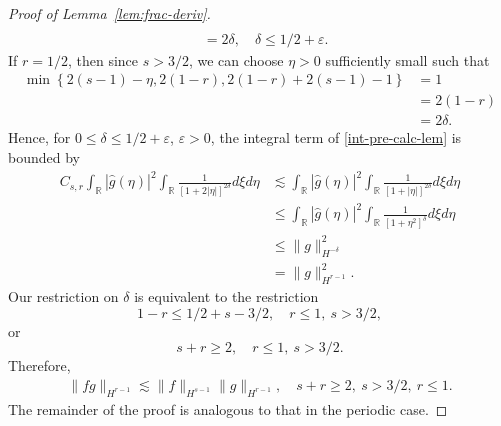 \documentclass[12pt,reqno]{amsart}
\numberwithin{equation}{section}  %
\numberwithin{figure}{section}
\newcommand{\rr}{\mathbb{R}}
\newcommand{\wh}{\widehat}
\newcommand{\ee}{\varepsilon}
\begin{document}
\begin{proof}[Proof of Lemma~\ref{lem:frac-deriv}]
\begin{equation*}
\begin{split}
  \\
  & = 2 \delta, \quad \delta \le 1/2 + \ee.
\end{split}
\end{equation*}
%
If $r = 1/2$, then since $s > 3/2$, we can choose $\eta > 0$ sufficiently small
such that
%
%
\begin{equation*}
\begin{split}
  \min\left\{ 2(s-1) -\eta , 2(1-r), 2(1-r) + 2(s-1) - 1  \right\}
  & = 1 
  \\
  & = 2(1 -r)
  \\
  & = 2\delta.
\end{split}
\end{equation*}
%
Hence, for $0 \le \delta \le 1/2 + \ee$, $\ee >
0$, the integral term of \eqref{int-pre-calc-lem} is bounded by
\begin{equation*}
\begin{split}
  C_{s,r} \int_{\rr}  | \wh{g}(\eta) |^{2} \int_{\rr} \frac{1}{\left[ 1
  + 2 |\eta| \right]^{2 \delta}} d \xi d \eta 
  & \lesssim
  \int_{\rr}  | \wh{g}(\eta) |^{2} \int_{\rr} \frac{1}{\left[ 1
  + |\eta| \right]^{2 \delta}} d \xi d \eta  
  \\
  & \le \int_{\rr}  | \wh{g}(\eta) |^{2} \int_{\rr} \frac{1}{\left[ 1
  + \eta^{2} \right]^{\delta}} d \xi d \eta  
  \\
  & \le \| g \|_{H^{-\delta}}^{2}
  \\
  & = \| g \|_{H^{r-1}}^{2}.
\end{split}
\end{equation*}
%
Our restriction on $\delta$ is equivalent to the restriction 
$$1-r \le 1/2 + s - 3/2, \quad r \le 1, \ s > 3/2,$$ or
$$s + r \ge 2,  \quad  r \le 1, \ s > 3/2.$$ Therefore, 
%
%
%
%
\begin{equation*}
\begin{split}
  \| f g \|_{H^{r-1}} \lesssim \| f \|_{H^{s-1}} \| g \|_{H^{r-1}},
  \quad s + r \ge 2, \ s > 3/2, \ r \le 1.
\end{split}
\end{equation*}
%
%
The remainder of the proof is analogous to that in the periodic case.
\end{proof}
\end{document}
